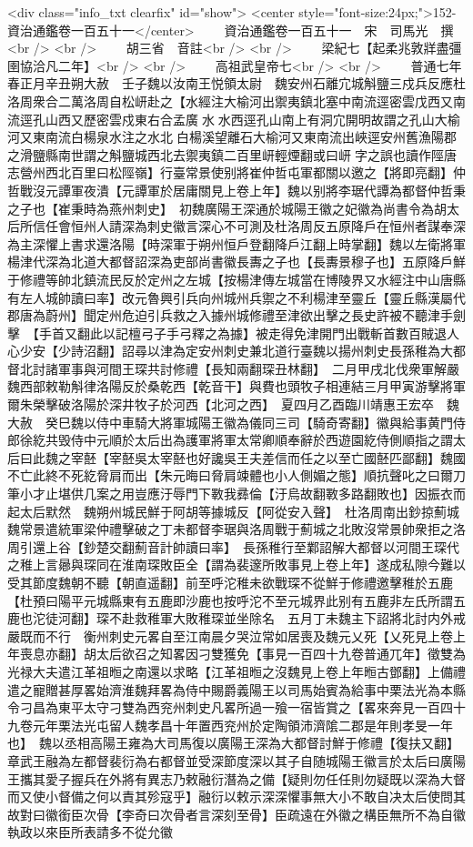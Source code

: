 <div class="info_txt clearfix" id="show">
<center style="font-size:24px;">152-資治通鑑卷一百五十一</center>
  　　資治通鑑卷一百五十一　宋　司馬光　撰<br />
<br />
　　胡三省　音註<br />
<br />
　　梁紀七【起柔兆敦牂盡彊圉協洽凡二年】<br />
<br />
　　高祖武皇帝七<br />
<br />
　　普通七年春正月辛丑朔大赦　壬子魏以汝南王悦領太尉　魏安州石離宂城斛鹽三戍兵反應杜洛周衆合二萬洛周自松岍赴之【水經注大榆河出禦夷鎮北塞中南流逕密雲戊西又南流逕孔山西又歷密雲戍東右合孟廣水水西逕孔山南上有洞宂開明故謂之孔山大榆河又東南流白楊泉水注之水北白楊溪望離石大榆河又東南流出峽逕安州舊漁陽郡之滑鹽縣南世謂之斛鹽城西北去禦夷鎮二百里岍輕煙翻或曰岍字之誤也讀作陘唐志營州西北百里曰松陘嶺】行臺常景使别將崔仲哲屯軍都關以邀之【將即亮翻】仲哲戰沒元譚軍夜潰【元譚軍於居庸關見上卷上年】魏以别將李琚代譚為都督仲哲秉之子也【崔秉時為燕州刺史】　初魏廣陽王深通於城陽王徽之妃徽為尚書令為胡太后所信任會恒州人請深為刺史徽言深心不可測及杜洛周反五原降戶在恒州者謀奉深為主深懼上書求還洛陽【時深軍于朔州恒戶登翻降戶江翻上時掌翻】魏以左衛將軍楊津代深為北道大都督詔深為吏部尚書徽長夀之子也【長夀景穆子也】五原降戶鮮于修禮等帥北鎮流民反於定州之左城【按楊津傳左城當在博陵界又水經注中山唐縣有左人城帥讀曰率】改元魯興引兵向州城州兵禦之不利楊津至靈丘【靈丘縣漢屬代郡唐為蔚州】聞定州危迫引兵救之入據州城修禮至津欲出擊之長史許被不聽津手劍擊　【手首又翻此以記檀弓子手弓釋之為據】被走得免津開門出戰斬首數百賊退人心少安【少詩沼翻】詔尋以津為定安州刺史兼北道行臺魏以揚州刺史長孫稚為大都督北討諸軍事與河間王琛共討修禮【長知兩翻琛丑林翻】　二月甲戌北伐衆軍解嚴　魏西部敕勒斛律洛陽反於桑乾西【乾音干】與費也頭牧子相連結三月甲寅游擊將軍爾朱榮擊破洛陽於深井牧子於河西【北河之西】　夏四月乙酉臨川靖惠王宏卒　魏大赦　癸巳魏以侍中車騎大將軍城陽王徽為儀同三司【騎奇寄翻】徽與給事黄門侍郎徐紇共毁侍中元順於太后出為護軍將軍太常卿順奉辭於西遊園紇侍側順指之謂太后曰此魏之宰噽【宰噽吳太宰噽也好讒吳王夫差信而任之以至亡國噽匹鄙翻】魏國不亡此終不死紇脅肩而出【朱元晦曰脅肩竦體也小人側媚之態】順抗聲叱之曰爾刀筆小才止堪供几案之用豈應汙辱門下斁我彞倫【汙烏故翻斁多路翻敗也】因振衣而起太后默然　魏朔州城民鮮于阿胡等據城反【阿從安入聲】　杜洛周南出鈔掠薊城魏常景遣統軍梁仲禮擊破之丁未都督李琚與洛周戰于薊城之北敗沒常景帥衆拒之洛周引還上谷【鈔楚交翻薊音計帥讀曰率】　長孫稚行至鄴詔解大都督以河間王琛代之稚上言曏與琛同在淮南琛敗臣全【謂為裴邃所敗事見上卷上年】遂成私隙今難以受其節度魏朝不聽【朝直遥翻】前至呼沱稚未欲戰琛不從鮮于修禮邀擊稚於五鹿【杜預曰陽平元城縣東有五鹿即沙鹿也按呼沱不至元城界此别有五鹿非左氏所謂五鹿也沱徒河翻】琛不赴救稚軍大敗稚琛並坐除名　五月丁未魏主下詔將北討内外戒嚴既而不行　衡州刺史元畧自至江南晨夕哭泣常如居喪及魏元乂死【乂死見上卷上年喪息亦翻】胡太后欲召之知畧因刁雙獲免【事見一百四十九卷普通兀年】徵雙為光禄大夫遣江革祖暅之南還以求略【江革祖暅之沒魏見上卷上年暅古鄧翻】上備禮遣之寵贈甚厚畧始濟淮魏拜畧為侍中賜爵義陽王以司馬始賓為給事中栗法光為本縣令刁昌為東平太守刁雙為西兖州刺史凡畧所過一飱一宿皆賞之【畧來奔見一百四十九卷元年栗法光屯留人魏孝昌十年置西兖州於定陶領沛濟隂二郡是年則孝旻一年也】　魏以丞相高陽王雍為大司馬復以廣陽王深為大都督討鮮于修禮【復扶又翻】章武王融為左都督裴衍為右都督並受深節度深以其子自随城陽王徽言於太后曰廣陽王攜其愛子握兵在外將有異志乃敕融衍潛為之備【疑則勿任任則勿疑既以深為大督而又使小督備之何以責其殄寇乎】融衍以敕示深深懼事無大小不敢自决太后使問其故對曰徽銜臣次骨【李奇曰次骨者言深刻至骨】臣疏遠在外徽之構臣無所不為自徽執政以來臣所表請多不從允徽